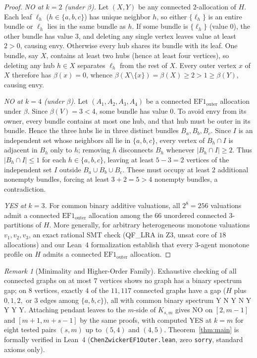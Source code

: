 \documentclass[11pt]{article}
\theoremstyle{remark}
\newtheorem{remark}[theorem]{Remark}
\begin{document}
\begin{proof}
\emph{\textup{NO} at $k = 2$ (under $\beta$).} Let $(X, Y)$ be any connected $2$-allocation of $H$. Each leaf $\ell_h$ ($h \in \{a, b, c\}$) has unique neighbor $h$, so either $\{\ell_h\}$ is an entire bundle or $\ell_h$ lies in the same bundle as $h$. If some bundle is $\{\ell_h\}$ (value $0$), the other bundle has value $3$, and deleting any single vertex leaves value at least $2 > 0$, causing envy. Otherwise every hub shares its bundle with its leaf. One bundle, say $X$, contains at least two hubs (hence at least four vertices), so deleting any hub $h \in X$ separates $\ell_h$ from the rest of $X$. Every outer vertex $x$ of $X$ therefore has $\beta(x) = 0$, whence $\beta(X \setminus \{x\}) = \beta(X) \ge 2 > 1 \ge \beta(Y)$, causing envy.

\emph{\textup{NO} at $k = 4$ (under $\beta$).} Let $(A_1, A_2, A_3, A_4)$ be a connected $\mathrm{EF1}_{\mathrm{outer}}$ allocation under $\beta$. Since $\beta(V) = 3 < 4$, some bundle has value $0$. To avoid envy from its owner, every bundle contains at most one hub, and that hub must be outer in its bundle. Hence the three hubs lie in three distinct bundles $B_a, B_b, B_c$. Since $I$ is an independent set whose neighbors all lie in $\{a, b, c\}$, every vertex of $B_h \cap I$ is adjacent in $B_h$ only to $h$; removing $h$ disconnects $B_h$ whenever $|B_h \cap I| \ge 2$. Thus $|B_h \cap I| \le 1$ for each $h \in \{a, b, c\}$, leaving at least $5 - 3 = 2$ vertices of the independent set $I$ outside $B_a \cup B_b \cup B_c$. These must occupy at least $2$ additional nonempty bundles, forcing at least $3 + 2 = 5 > 4$ nonempty bundles, a contradiction.

\emph{\textup{YES} at $k = 3$.} For common binary additive valuations, all $2^8 = 256$ valuations admit a connected $\mathrm{EF1}_{\mathrm{outer}}$ allocation among the $66$ unordered connected $3$-partitions of $H$. More generally, for arbitrary heterogeneous monotone valuations $v_1, v_2, v_3$, an exact rational SMT check (\textup{QF\_LRA} in Z3, unsat core of $18$ allocations) and our Lean~4 formalization establish that every $3$-agent monotone profile on $H$ admits a connected $\mathrm{EF1}_{\mathrm{outer}}$ allocation.
\end{proof}

\begin{remark}[Minimality and Higher-Order Family]
Exhaustive checking of all connected graphs on at most $7$ vertices shows no graph has a binary spectrum gap; on $8$ vertices, exactly $4$ of the $11{,}117$ connected graphs have a gap ($H$ plus $0, 1, 2,$ or $3$ edges among $\{a, b, c\}$), all with common binary spectrum \textup{Y N Y N Y Y Y Y}. Attaching pendant leaves to the $m$-side of $K_{s,m}$ gives \textup{NO} on $[2, m-1]$ and $[m+1, m+s-1]$ by the same proofs, with computed \textup{YES} at $k = m$ for eight tested pairs $(s, m)$ up to $(5, 4)$ and $(4, 5)$. Theorem~\ref{thm:main} is formally verified in Lean~4 (\texttt{ChenZwickerEF1Outer.lean}, zero \texttt{sorry}, standard axioms only).
\end{remark}
\end{document}
